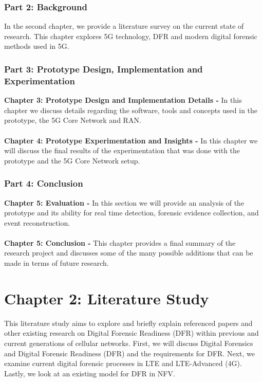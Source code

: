 \documentclass[final,1p,times,authoryear]{elsarticle}
\begin{document}
\subsubsection{Part 2: Background}
\label{sub1sub7sec2}
In the second chapter, we provide a literature survey on the current state of research. This chapter explores 5G technology, DFR and modern digital forensic methods used in 5G.
\subsubsection{Part 3: Prototype Design, Implementation and Experimentation}
\label{sub1sub7sec3}
\textbf{Chapter 3: Prototype Design and Implementation Details -} In this chapter we discuss details regarding the software, tools and concepts used in the prototype, the 5G Core Network and RAN.
\\\\
\textbf{Chapter 4: Prototype Experimentation and Insights -} In this chapter we will discuss the final results of the experimentation that was done with the prototype and the 5G Core Network setup.
\subsubsection{Part 4: Conclusion}
\label{sub1sub7sec4}
\textbf{Chapter 5: Evaluation -} In this section we will provide an analysis of the prototype and its ability for real time detection, forensic evidence collection, and event reconstruction.
\\\\
\textbf{Chapter 5: Conclusion -} This chapter provides a final summary of the research project and discusses some of the many possible additions that can be made in terms of future research.
\newpage

\section{Chapter 2: Literature Study}
\label{sec2}
This literature study aims to explore and briefly explain referenced papers and other existing research on Digital Forensic Readiness (DFR) within previous and current generations of cellular networks. First, we will discuss Digital Forensics and Digital Forensic Readiness (DFR) and the requirements for DFR. Next, we examine current digital forensic processes in LTE and LTE-Advanced (4G). Lastly, we look at an existing model for DFR in NFV.
\end{document}
